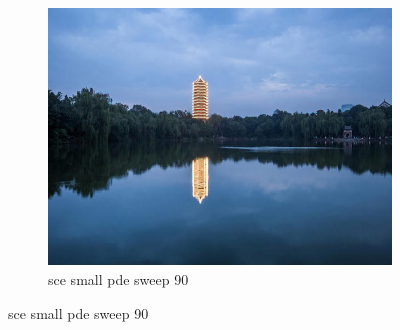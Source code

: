 \documentclass[11pt]{article}
\begin{document}
\begin{figure}[ht!]
\begin{subfigure}[]{0.333\linewidth}
        \centering
        \includegraphics[width=\linewidth]{fig/restoration/sce_small/pde_90.jpg}
        \caption{sce small pde sweep 90}
    \end{subfigure}%
\end{figure}
\end{document}
